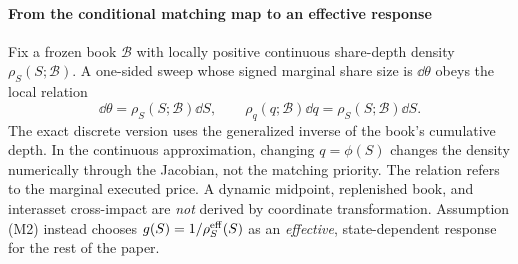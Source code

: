 \documentclass[review,hidelinks,onefignum,onetabnum]{siamonline250211}
\begin{document}
\paragraph{From the conditional matching map to an effective response} Fix a frozen book $\mathcal B$ with locally positive continuous share-depth density $\rho_S(S;\mathcal B)$. A one-sided sweep whose signed marginal share size is $\dd\theta$ obeys the local relation
\begin{equation}\label{eq:frozen-depth}
\dd\theta=\rho_S(S;\mathcal B)\dd S,
\qquad \rho_q(q;\mathcal B)\dd q=\rho_S(S;\mathcal B)\dd S.
\end{equation}
The exact discrete version uses the generalized inverse of the book's cumulative depth. In the continuous approximation, changing $q=\phi(S)$ changes the density numerically through the Jacobian, not the matching priority. The relation refers to the marginal executed price. A dynamic midpoint, replenished book, and interasset cross-impact are \emph{not} derived by coordinate transformation. Assumption (M2) instead chooses $g(S)=1/\rho_S^{\rm eff}(S)$ as an \emph{effective}, state-dependent response for the rest of the paper.
\end{document}
